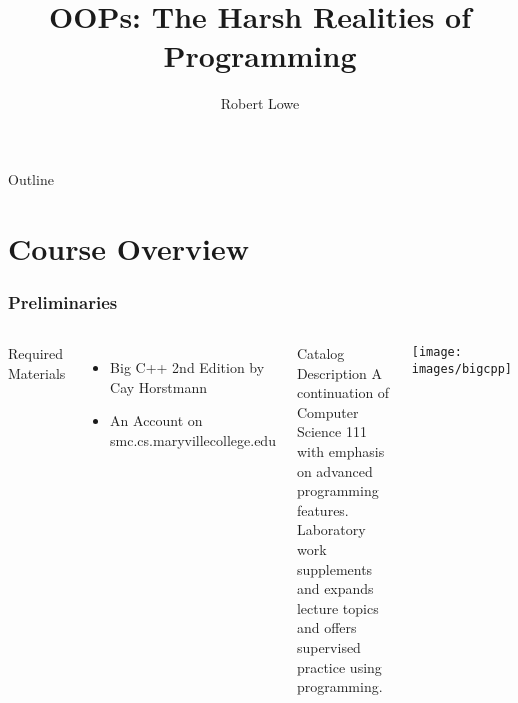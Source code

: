 \documentclass[handout]{beamer}
\title{OOPs: The Harsh Realities of Programming}
\author{Robert Lowe\\}
\institute[Maryville College] %
{
  Division of Mathematics and Computer Science\\
  Maryville College
}
\date[]{}
\begin{document}
\begin{frame}
  \titlepage
\end{frame}

\begin{frame}{Outline}
  \tableofcontents
\end{frame}




\section{Course Overview}
\begin{frame}
   \frametitle{Preliminaries}
   \begin{columns}
      Required Materials
      \begin{itemize}
         \item Big C++ 2nd Edition by Cay Horstmann
         \item An Account on smc.cs.maryvillecollege.edu
      \end{itemize}
      \begin{block}{Catalog Description}
      A continuation of Computer Science 111 with emphasis on advanced programming features. Laboratory work supplements and expands lecture topics and offers supervised practice using programming.
      \end{block}
      \texttt{[image: images/bigcpp]}
   \end{columns}
\end{frame}
\end{document}
